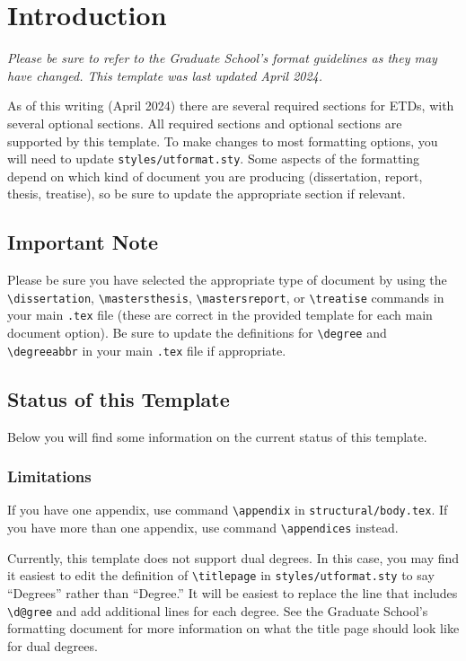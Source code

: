 \chapter{Introduction}
\emph{Please be sure to refer to the Graduate School's format guidelines as they may have changed. This template was last updated April 2024.}

As of this writing (April 2024) there are several required sections for ETDs, with several optional sections. All required sections and optional sections are supported by this template. To make changes to most formatting options, you will need to update \texttt{styles/utformat.sty}. Some aspects of the formatting depend on which kind of document you are producing (dissertation, report, thesis, treatise), so be sure to update the appropriate section if relevant.

\section{Important Note}
Please be sure you have selected the appropriate type of document by using the \texttt{\textbackslash{}dissertation}, \texttt{\textbackslash{}mastersthesis}, \texttt{\textbackslash{}mastersreport}, or \texttt{\textbackslash{}treatise} commands in your main \texttt{.tex} file (these are correct in the provided template for each main document option). Be sure to update the definitions for \texttt{\textbackslash{}degree} and \texttt{\textbackslash{}degreeabbr} in your main \texttt{.tex} file if appropriate.

\section{Status of this Template}
Below you will find some information on the current status of this template.
\subsection{Limitations}
If you have one appendix, use command \texttt{\textbackslash{}appendix} in \texttt{structural/body.tex}. If you have more than one appendix, use command \texttt{\textbackslash{}appendices} instead.

Currently, this template does not support dual degrees. In this case, you may find it easiest to edit the definition of \texttt{\textbackslash{}titlepage} in \texttt{styles/utformat.sty} to say ``Degrees'' rather than ``Degree.'' It will be easiest to replace the line that includes \texttt{\textbackslash{}d@gree} and add additional lines for each degree. See the Graduate School's formatting document for more information on what the title page should look like for dual degrees.


